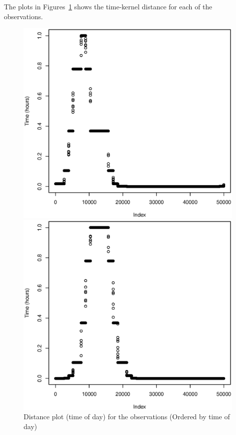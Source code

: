 \documentclass[a4paper, twocolumn]{article}
\begin{document}
    The plots in Figures~\ref{fig:time} shows the time-kernel distance for each of the observations.  
    \begin{figure}[H]
    \centering
    \caption{Distance plot (time of day) for the observations (Ordered by time of day) \label{fig:time}}
	    \begin{minipage}[]{0.2\textwidth}
	    	\includegraphics[width=\textwidth]{share/1_time.eps}
	    \end{minipage}
	    \begin{minipage}[]{0.2\textwidth}
	    	\includegraphics[width=\textwidth]{share/2_time.eps}

\end{minipage}
\end{figure}
\end{document}
